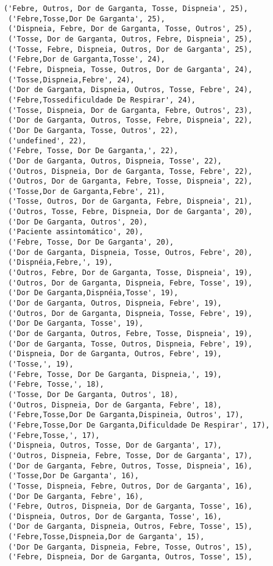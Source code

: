 \documentclass[11pt]{article}
\begin{document}
\begin{tcolorbox}[breakable, size=fbox, boxrule=.5pt, pad at break*=1mm, opacityfill=0]
\begin{Verbatim}[commandchars=\\\{\}]
 ('Febre, Outros, Dor de Garganta, Tosse, Dispneia', 25),
 ('Febre,Tosse,Dor De Garganta', 25),
 ('Dispneia, Febre, Dor de Garganta, Tosse, Outros', 25),
 ('Tosse, Dor de Garganta, Outros, Febre, Dispneia', 25),
 ('Tosse, Febre, Dispneia, Outros, Dor de Garganta', 25),
 ('Febre,Dor de Garganta,Tosse', 24),
 ('Febre, Dispneia, Tosse, Outros, Dor de Garganta', 24),
 ('Tosse,Dispneia,Febre', 24),
 ('Dor de Garganta, Dispneia, Outros, Tosse, Febre', 24),
 ('Febre,Tossedificuldade De Respirar', 24),
 ('Tosse, Dispneia, Dor de Garganta, Febre, Outros', 23),
 ('Dor de Garganta, Outros, Tosse, Febre, Dispneia', 22),
 ('Dor De Garganta, Tosse, Outros', 22),
 ('undefined', 22),
 ('Febre, Tosse, Dor De Garganta,', 22),
 ('Dor de Garganta, Outros, Dispneia, Tosse', 22),
 ('Outros, Dispneia, Dor de Garganta, Tosse, Febre', 22),
 ('Outros, Dor de Garganta, Febre, Tosse, Dispneia', 22),
 ('Tosse,Dor de Garganta,Febre', 21),
 ('Tosse, Outros, Dor de Garganta, Febre, Dispneia', 21),
 ('Outros, Tosse, Febre, Dispneia, Dor de Garganta', 20),
 ('Dor De Garganta, Outros', 20),
 ('Paciente assintomático', 20),
 ('Febre, Tosse, Dor De Garganta', 20),
 ('Dor de Garganta, Dispneia, Tosse, Outros, Febre', 20),
 ('Dispnéia,Febre,', 19),
 ('Outros, Febre, Dor de Garganta, Tosse, Dispneia', 19),
 ('Outros, Dor de Garganta, Dispneia, Febre, Tosse', 19),
 ('Dor De Garganta,Dispnéia,Tosse', 19),
 ('Dor de Garganta, Outros, Dispneia, Febre', 19),
 ('Outros, Dor de Garganta, Dispneia, Tosse, Febre', 19),
 ('Dor De Garganta, Tosse', 19),
 ('Dor de Garganta, Outros, Febre, Tosse, Dispneia', 19),
 ('Dor de Garganta, Tosse, Outros, Dispneia, Febre', 19),
 ('Dispneia, Dor de Garganta, Outros, Febre', 19),
 ('Tosse,', 19),
 ('Febre, Tosse, Dor De Garganta, Dispneia,', 19),
 ('Febre, Tosse,', 18),
 ('Tosse, Dor De Garganta, Outros', 18),
 ('Outros, Dispneia, Dor de Garganta, Febre', 18),
 ('Febre,Tosse,Dor De Garganta,Dispineia, Outros', 17),
 ('Febre,Tosse,Dor De Garganta,Dificuldade De Respirar', 17),
 ('Febre,Tosse,', 17),
 ('Dispneia, Outros, Tosse, Dor de Garganta', 17),
 ('Outros, Dispneia, Febre, Tosse, Dor de Garganta', 17),
 ('Dor de Garganta, Febre, Outros, Tosse, Dispneia', 16),
 ('Tosse,Dor De Garganta', 16),
 ('Tosse, Dispneia, Febre, Outros, Dor de Garganta', 16),
 ('Dor De Garganta, Febre', 16),
 ('Febre, Outros, Dispneia, Dor de Garganta, Tosse', 16),
 ('Dispneia, Outros, Dor de Garganta, Tosse', 16),
 ('Dor de Garganta, Dispneia, Outros, Febre, Tosse', 15),
 ('Febre,Tosse,Dispneia,Dor de Garganta', 15),
 ('Dor De Garganta, Dispneia, Febre, Tosse, Outros', 15),
 ('Febre, Dispneia, Dor de Garganta, Outros, Tosse', 15),

\end{Verbatim}
\end{tcolorbox}
\end{document}
